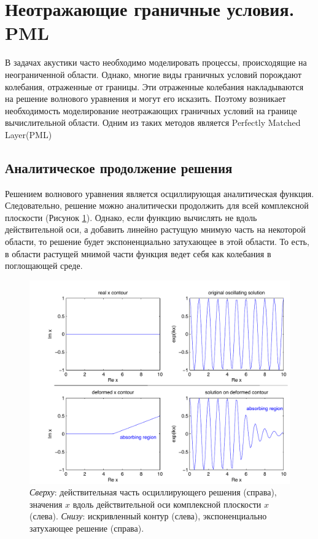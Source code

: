 \documentclass[a4paper, fontsize=14pt]{article}
\begin{document}
\section{Неотражающие граничные условия. PML}
    В задачах акустики часто необходимо моделировать процессы, происходящие на неограниченной
области. Однако, многие виды граничных условий порождают колебания, отраженные от границы.
Эти отраженные колебания накладываются на решение волнового уравнения и могут его исказить.
Поэтому возникает необходимость моделирование неотражающих граничных условий на границе
вычислительной области. Одним из таких методов является Perfectly Matched Layer(PML)
\subsection{Аналитическое продолжение решения}
	Решением волнового уравнения является осциллирующая аналитическая функция. Следовательно, решение
можно аналитически продолжить для всей комплексной плоскости (Рисунок \ref{pmlcont}). Однако, если функцию вычислять не
вдоль действительной оси, а добавить линейно растущую мнимую часть на некоторой области, то решение будет
экспоненциально затухающее в этой области. То есть, в области растущей мнимой части функция ведет себя как колебания в
поглощающей среде. \cite{npml}
\begin{figure}[H]
	\centering
	\includegraphics[width=1\columnwidth]{pml-continuation}
	\caption{\emph{Сверху}: действительная часть осциллирующего решения (справа), значения $x$ вдоль
	действительной оси комплексной плоскости $x$ (слева).
	\emph{Снизу}: искривленный контур (слева), экспоненциально затухающее решение (справа). 
	}
	\label{pmlcont}

\end{figure}
\end{document}

